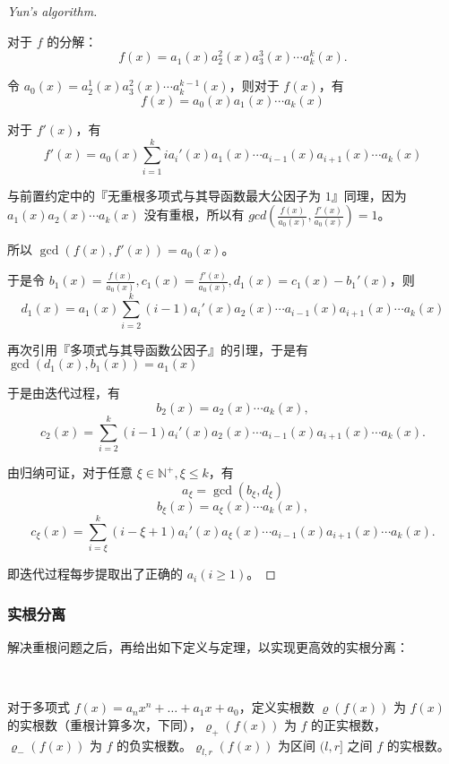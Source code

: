 \begin{proof}[Yun's algorithm]~

	对于 $f$ 的分解：
	$$
	f(x) = a_1(x) a_2^2(x) a_3^3(x) \cdots a_k^k (x).
	$$

	令 $a_0(x) = a_2^1(x) a_3^2(x) \cdots a_k^{k - 1}(x)$，则对于 $f(x)$，有
	$$
	f(x) = a_0(x) a_1(x) \cdots a_k(x)
	$$

	对于 $f'(x)$，有
	$$
	f'(x) = a_0(x) \sum_{i=1}^{k} i a_i'(x) a_1(x) \cdots a_{i - 1}(x) a_{i + 1}(x) \cdots a_k(x)
	$$

	与前置约定中的『无重根多项式与其导函数最大公因子为 $1$』同理，因为 $a_1(x) a_2(x) \cdots a_k(x)$ 没有重根，所以有 $gcd(\frac{f(x)}{a_0(x)}, \frac{f'(x)}{a_0(x)}) = 1$。

	所以 $\gcd(f(x), f'(x)) = a_0(x)$。

	于是令 $b_1(x) = \frac{f(x)}{a_0(x)}, c_1(x) = \frac{f'(x)}{a_0(x)}, d_1(x) = c_1(x) - b_1'(x)$，则
	$$
	d_1(x) = a_1(x) \sum_{i=2}^{k} (i - 1) a_i'(x) a_2(x) \cdots a_{i - 1}(x) a_{i + 1}(x) \cdots a_k(x)
	$$

	再次引用『多项式与其导函数公因子』的引理，于是有 $\gcd(d_1(x), b_1(x)) = a_1(x)$

	于是由迭代过程，有
	$$
	b_2(x) = a_2(x) \cdots a_k(x),
	$$
	$$
	c_2(x) = \sum_{i=2}^{k} (i - 1) a_i'(x) a_2(x) \cdots a_{i - 1}(x) a_{i + 1}(x) \cdots a_k(x).
	$$

	由归纳可证，对于任意 $\xi \in \mathbb{N}^+, \xi \leq k$，有
	$$
	a_\xi = \gcd(b_{\xi}, d_{\xi})
	$$
	$$
	b_\xi(x) = a_\xi(x) \cdots a_k(x),
	$$
	$$
	c_\xi(x) = \sum_{i=\xi}^{k} (i - \xi + 1) a_i'(x) a_\xi(x) \cdots a_{i - 1}(x) a_{i + 1}(x) \cdots a_k(x).
	$$

	即迭代过程每步提取出了正确的 $a_i (i \geq 1)$。\qedhere


\end{proof}

\subsubsection{实根分离}

解决重根问题之后，再给出如下定义与定理，以实现更高效的实根分离：

\begin{definition}[实根数]~

	对于多项式 $f(x) = a_n x^n + \dots + a_1 x + a_0$，定义实根数 $\varrho(f(x))$ 为 $f(x)$ 的实根数（重根计算多次，下同），$\varrho_+(f(x))$ 为 $f$ 的正实根数，$\varrho_-(f(x))$ 为 $f$ 的负实根数。$\varrho_{l,r}(f(x))$ 为区间 $(l, r]$ 之间 $f$ 的实根数。

	
\end{definition}

